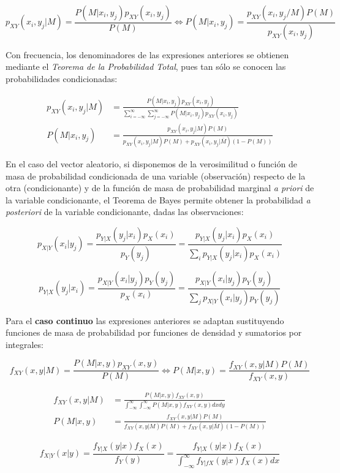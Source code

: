 \documentclass[11pt]{article}
\begin{document}
\[p_{XY}(x_i,y_j | M) = \frac{P(M | x_i,y_j)p_{XY}(x_i,y_j)}{P(M)} \iff P(M |x_i,y_j) = \frac{p_{XY}(x_i,y_j/M)P(M)}{p_{XY}(x_i,y_j)}\]

Con frecuencia, los denominadores de las expresiones anteriores se
obtienen mediante el \emph{Teorema de la Probabilidad Total}, pues tan
sólo se conocen las probabilidades condicionadas:

\begin{align*}
p_{XY}(x_i,y_j | M) &= \frac{P(M | x_i,y_j)p_{XY}(x_i,y_j)}{\sum_{i=-\infty}^\infty \sum_{j=-\infty}^\infty P(M | x_i,y_j) p_{XY}(x_i,y_j)} \\ 
P(M | x_i,y_j) &= \frac{p_{XY}(x_i,y_j | M)P(M)}{p_{XY}(x_i,y_j | M)P(M)+p_{XY}(x_i,y_j | \overline M)(1-P(M))}
\end{align*}

    En el caso del vector aleatorio, si disponemos de la verosimilitud o
función de masa de probabilidad condicionada de una variable
(observación) respecto de la otra (condicionante) y de la función de
masa de probabilidad marginal \emph{a priori} de la variable
condicionante, el Teorema de Bayes permite obtener la probabilidad
\emph{a posteriori} de la variable condicionante, dadas las
observaciones:

\[p_{X | Y}(x_i | y_j) = \frac{p_{Y | X}(y_j | x_i)p_X(x_i)}{p_Y(y_j)}=\frac{p_{Y | X}(y_j | x_i)p_X(x_i)}{\sum_i p_{Y | X}(y_j |x_i)p_{X}(x_i)}\]

\[p_{Y | X}(y_j | x_i) = \frac{p_{X | Y}(x_i | y_j)p_Y(y_j)}{p_X(x_i)}=\frac{p_{X | Y}(x_i | y_j)p_Y(y_j)}{\sum_j p_{X | Y}(x_i | y_j)p_{Y}(y_j)}\]

    Para el \textbf{caso continuo} las expresiones anteriores se adaptan
sustituyendo funciones de masa de probabilidad por funciones de densidad
y sumatorios por integrales:

\[f_{XY}(x,y | M) = \frac{P(M | x,y)p_{XY}(x,y)}{P(M)} \iff P(M |x,y) = \frac{f_{XY}(x,y | M)P(M)}{f_{XY}(x,y)}\]

\begin{align*}
f_{XY}(x,y | M) &= \frac{P(M | x,y)f_{XY}(x,y)}{\int_{-\infty}^\infty \int_{-\infty}^\infty P(M | x,y) f_{XY}(x,y)dxdy} \\ 
P(M | x,y) &= \frac{f_{XY}(x,y | M)P(M)}{f_{XY}(x,y | M)P(M)+f_{XY}(x,y | \overline M)(1-P(M))}
\end{align*}

\[f_{X | Y}(x | y) = \frac{f_{Y | X}(y | x)f_X(x)}{f_Y(y)}=\frac{f_{Y | X}(y | x)f_X(x)}{\int_{-\infty}^\infty f_{Y |f X}(y |x)f_{X}(x)dx}\]
\end{document}
